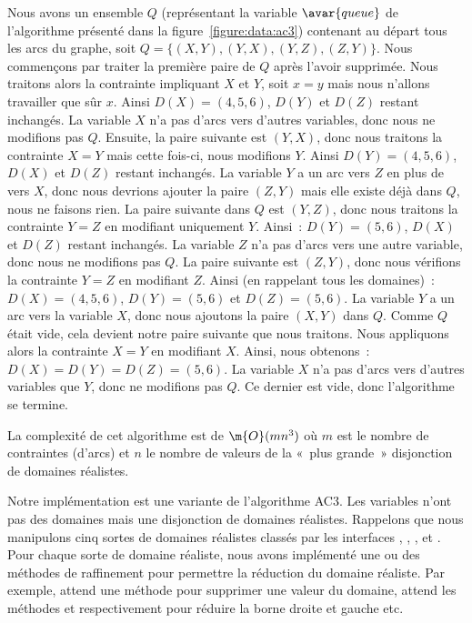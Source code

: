 \begin{example}
Nous avons un ensemble $Q$ (représentant la variable $\avar{queue}$ de
l'algorithme présenté dans la figure~\ref{figure:data:ac3}) contenant au départ
tous les arcs du graphe, soit $Q = \{(X, Y), (Y, X), (Y, Z), (Z, Y)\}$. Nous
commençons par traiter la première paire de $Q$ après l'avoir supprimée. Nous
traitons alors la contrainte impliquant $X$ et $Y$, soit $x = y$ mais nous
n'allons travailler que sûr $x$.  Ainsi $D(X) = (4, 5, 6)$, $D(Y)$ et $D(Z)$
restant inchangés. La variable $X$ n'a pas d'arcs vers d'autres variables, donc
nous ne modifions pas $Q$. Ensuite, la paire suivante est $(Y, X)$, donc nous
traitons la contrainte $X = Y$ mais cette fois-ci, nous modifions $Y$. Ainsi
$D(Y) = (4, 5, 6)$, $D(X)$ et $D(Z)$ restant inchangés. La variable $Y$ a un arc
vers $Z$ en plus de vers $X$, donc nous devrions ajouter la paire $(Z, Y)$ mais
elle existe déjà dans $Q$, nous ne faisons rien. La paire suivante dans $Q$ est
$(Y, Z)$, donc nous traitons la contrainte $Y = Z$ en modifiant uniquement $Y$.
Ainsi~: $D(Y) = (5, 6)$, $D(X)$ et $D(Z)$ restant inchangés. La variable $Z$ n'a
pas d'arcs vers une autre variable, donc nous ne modifions pas $Q$. La paire
suivante est $(Z, Y)$, donc nous vérifions la contrainte $Y = Z$ en modifiant
$Z$. Ainsi (en rappelant tous les domaines)~: $D(X) = (4, 5, 6)$, $D(Y) = (5,
6)$ et $D(Z) = (5, 6)$. La variable $Y$ a un arc vers la variable $X$, donc nous
ajoutons la paire $(X, Y)$ dans $Q$. Comme $Q$ était vide, cela devient notre
paire suivante que nous traitons. Nous appliquons alors la contrainte $X = Y$ en
modifiant $X$. Ainsi, nous obtenons~: $D(X) = D(Y) = D(Z) = (5, 6)$. La variable
$X$ n'a pas d'arcs vers d'autres variables que $Y$, donc ne modifions pas $Q$.
Ce dernier est vide, donc l'algorithme se termine.

\end{example}

La complexité de cet algorithme est de $\m{O}(mn^3)$ où $m$ est le nombre de
contraintes (d'arcs) et $n$ le nombre de valeurs de la «~plus grande~»
disjonction de domaines réalistes.

Notre implémentation est une variante de l'algorithme AC3. Les variables n'ont
pas des domaines mais une disjonction de domaines réalistes. Rappelons que nous
manipulons cinq sortes de domaines réalistes classés par les interfaces
, , ,  et
. Pour chaque sorte de domaine réaliste, nous avons implémenté
une ou des méthodes de raffinement pour permettre la réduction du domaine
réaliste. Par exemple,  attend une méthode  pour
supprimer une valeur du domaine,  attend les méthodes
 et  respectivement pour réduire la borne
droite et gauche etc.

